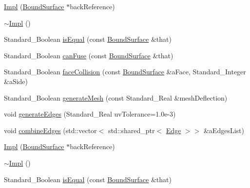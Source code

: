 \begin{DoxyCompactItemize}
\item 
\hyperlink{classMcCAD_1_1Geometry_1_1BoundSurface_1_1Impl_a3bbe92f20894f053391da44c2b489536}{Impl} (\hyperlink{classMcCAD_1_1Geometry_1_1BoundSurface}{Bound\+Surface} $\ast$back\+Reference)
\item 
\hyperlink{classMcCAD_1_1Geometry_1_1BoundSurface_1_1Impl_afe7223297b4ea10bef717b75fe63ce88}{$\sim$\+Impl} ()
\item 
Standard\+\_\+\+Boolean \hyperlink{classMcCAD_1_1Geometry_1_1BoundSurface_1_1Impl_a1b298b978b9c10e6dbdb160ce1ce17f9}{is\+Equal} (const \hyperlink{classMcCAD_1_1Geometry_1_1BoundSurface}{Bound\+Surface} \&that)
\item 
Standard\+\_\+\+Boolean \hyperlink{classMcCAD_1_1Geometry_1_1BoundSurface_1_1Impl_af5148dae00248364c869ac60e144afba}{can\+Fuse} (const \hyperlink{classMcCAD_1_1Geometry_1_1BoundSurface}{Bound\+Surface} \&that)
\item 
Standard\+\_\+\+Boolean \hyperlink{classMcCAD_1_1Geometry_1_1BoundSurface_1_1Impl_ab2379be9047959a97d433699c13248a3}{face\+Collision} (const \hyperlink{classMcCAD_1_1Geometry_1_1BoundSurface}{Bound\+Surface} \&a\+Face, Standard\+\_\+\+Integer \&a\+Side)
\item 
Standard\+\_\+\+Boolean \hyperlink{classMcCAD_1_1Geometry_1_1BoundSurface_1_1Impl_a3b3d4989cf11d9d13155106dbd5875b2}{generate\+Mesh} (const Standard\+\_\+\+Real \&mesh\+Deflection)
\item 
void \hyperlink{classMcCAD_1_1Geometry_1_1BoundSurface_1_1Impl_aa33a79300814d621fa5394682eb8b778}{generate\+Edges} (Standard\+\_\+\+Real uv\+Tolerance=1.\+0e-\/3)
\item 
void \hyperlink{classMcCAD_1_1Geometry_1_1BoundSurface_1_1Impl_ac4d7badfc8a2ea9448e49f325a1b4636}{combine\+Edges} (std\+::vector$<$ std\+::shared\+\_\+ptr$<$ \hyperlink{classMcCAD_1_1Geometry_1_1Edge}{Edge} $>$$>$ \&a\+Edges\+List)
\item 
\hyperlink{classMcCAD_1_1Geometry_1_1BoundSurface_1_1Impl_a3bbe92f20894f053391da44c2b489536}{Impl} (\hyperlink{classMcCAD_1_1Geometry_1_1BoundSurface}{Bound\+Surface} $\ast$back\+Reference)
\item 
\hyperlink{classMcCAD_1_1Geometry_1_1BoundSurface_1_1Impl_afe7223297b4ea10bef717b75fe63ce88}{$\sim$\+Impl} ()
\item 
Standard\+\_\+\+Boolean \hyperlink{classMcCAD_1_1Geometry_1_1BoundSurface_1_1Impl_a1b298b978b9c10e6dbdb160ce1ce17f9}{is\+Equal} (const \hyperlink{classMcCAD_1_1Geometry_1_1BoundSurface}{Bound\+Surface} \&that)
$$
\end{DoxyCompactItemize}
